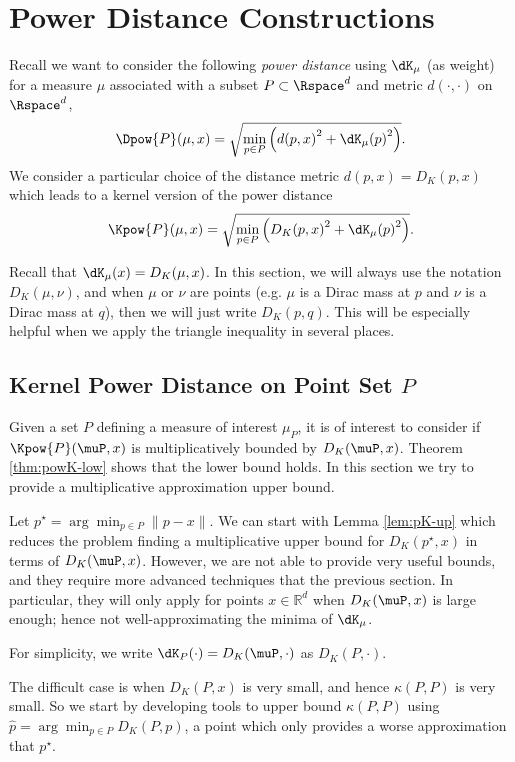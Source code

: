 \documentclass[11pt]{myclass}
\begin{document}
\section{Power Distance Constructions}
\label{app:power}
Recall we want to consider the following \emph{power distance} using $\dK_\mu$ (as weight) for a measure $\mu$ associated with a subset $P \subset \Rspace^d$ and metric $d(\cdot, \cdot)$ on $\Rspace^d$,
\[
\Dpow{P}(\mu,x) = \sqrt{\min_{p \in P} \left( {d(p,x)}^2 + {\dK_\mu(p)}^2 \right) }. 
\]
We consider a particular choice of the distance metric $d(p,x) = D_K(p,x)$ which leads to a kernel version of the power distance
\[
\Kpow{P}(\mu, x) = \sqrt{\min_{p \in P} \left( {D_K(p,x)}^2 + {\dK_\mu(p)}^2 \right) }.
\]

Recall that $\dK_\mu(x) = D_K(\mu,x)$.  In this section, we will always use the notation $D_K(\mu,\nu)$, and when $\mu$ or $\nu$ are points (e.g. $\mu$ is a Dirac mass at $p$ and $\nu$ is a Dirac mass at $q$), then we will just write $D_K(p,q)$.  This will be especially helpful when we apply the triangle inequality in several places.  



\subsection{Kernel Power Distance on Point Set $P$}
\label{app:pow-justP}
Given a set $P$ defining a measure of interest $\mu_P$, it is of interest to consider if $\Kpow{P}(\muP,x)$ is multiplicatively bounded by $D_K(\muP,x)$.  Theorem \ref{thm:powK-low} shows that the lower bound holds.  In this section we try to provide a multiplicative approximation upper bound.  

Let $p^\star = \arg \min_{p \in P} \|p-x\|$.
We can start with Lemma \ref{lem:pK-up} which reduces the problem finding a multiplicative upper bound for $D_K(p^\star,x)$ in terms of $D_K(\muP,x)$.  
However, we are not able to provide very useful bounds, and they require more advanced techniques that the previous section.  In particular, they will only apply for points $x \in \mathbb{R}^d$ when $D_K(\muP,x)$ is large enough; hence not well-approximating the minima of $\dK_\mu$.  

For simplicity, we write $\dK_P(\cdot) = D_K(\muP,\cdot)$ as $D_K(P, \cdot)$. 

The difficult case is when $D_K(P,x)$ is very small, and hence $\kappa(P,P)$ is very small.  So we start by developing tools to upper bound $\kappa(P,P)$ using $\hat p = \arg \min_{p \in P} D_K(P,p)$, a point which only provides a worse approximation that $p^\star$.  
\end{document}
